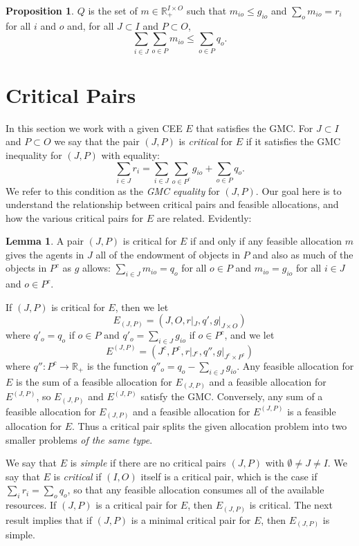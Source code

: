 \documentclass[12pt]{article}
\theoremstyle{definition}
\newtheorem{prop}{Proposition}
\newtheorem{lem}{Lemma}
\renewcommand{\Re}{\mathbb{R}}
\begin{document}
\begin{prop} \label{prop:mFeasible}
  $Q$ is the set of $m \in \Re^{I \times O}_+$ such that $m_{io} \le g_{io}$ and $\sum_o m_{io} = r_i$ for all $i$ and $o$ and, for all $J \subset I$ and $P \subset O$,
  $$\sum_{i \in J} \sum_{o \in P} m_{io} \le \sum_{o \in P} q_o.$$
\end{prop}



\section{Critical Pairs} \label{sec:Critical}

In this section we work with a given CEE $E$ that satisfies the GMC.
For $J \subset I$ and $P \subset O$ we say that the pair $(J,P)$ is \emph{critical} for $E$ if it satisfies the GMC inequality for $(J,P)$ with equality:
$$\sum_{i \in J} r_i = \sum_{i \in J} \sum_{o
  \in P^c} g_{io} + \sum_{o \in P} q_o.$$   
We refer to this condition as the \emph{GMC equality} for $(J,P)$. Our goal here is to understand the relationship between critical pairs and feasible allocations, and how the various critical pairs for $E$ are related.  Evidently:

\begin{lem}
  A pair $(J,P)$ is critical for $E$ if and only if any feasible allocation $m$ gives the agents in $J$ all of the endowment of objects in $P$ and also as much of the objects in $P^c$ as $g$ allows: $\sum_{i \in J} m_{io} = q_o$ for all $o \in P$ and $m_{io} = g_{io}$ for all $i \in J$ and $o \in P^c$.
\end{lem}

If $(J,P)$ is critical for $E$, then we let $$E_{(J,P)} = (J,O,r|_J,q',g|_{J \times O})$$ where $q'_o = q_o$ if $o \in P$  and $q'_o = \sum_{i \in J} g_{io}$ if $o \in P^c$, and we let  $$E^{(J,P)} = (J^c, P^c, r|_{J^c},q'',g|_{J^c \times P^c})$$ where $q'' \colon P^c \to \Re_+$ is the function $q''_o = q_o - \sum_{i \in J} g_{io}$. 
 Any feasible allocation for $E$ is the sum of a feasible  allocation for $E_{(J,P)}$ and a feasible allocation  for  $E^{(J,P)}$, so $E_{(J,P)}$ and  $E^{(J,P)}$ satisfy the GMC.  Conversely, any sum of a feasible allocation for $E_{(J,P)}$ and a feasible allocation for $E^{(J,P)}$ is a feasible allocation for $E$. Thus a critical pair splits the given allocation problem into two smaller problems \emph{of the same type}.

We say that $E$ is \emph{simple} if there are no critical pairs $(J,P)$ with $\emptyset \ne J \ne I$.  We say that $E$ is \emph{critical} if $(I,O)$ itself is a critical pair, which is the case if $\sum_i r_i = \sum_o q_o$, so that any feasible allocation consumes all of the available resources. 
If $(J,P)$ is a critical pair for $E$, then $E_{(J,P)}$ is critical.  The next result implies that if $(J,P)$ is a minimal critical pair for $E$, then $E_{(J,P)}$ is simple.
\end{document}

